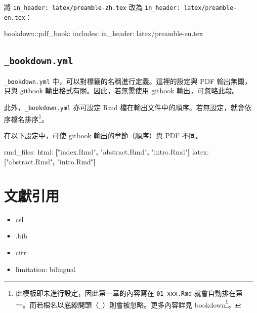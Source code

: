 \documentclass[oneside]{book}
\newenvironment{Shaded}{\begin{snugshade}}{\end{snugshade}}
\newcommand{\KeywordTok}[1]{\textcolor[rgb]{0.13,0.29,0.53}{\textbf{#1}}}
\newcommand{\StringTok}[1]{\textcolor[rgb]{0.31,0.60,0.02}{#1}}
\newcommand{\FunctionTok}[1]{\textcolor[rgb]{0.00,0.00,0.00}{#1}}
\newcommand{\AttributeTok}[1]{\textcolor[rgb]{0.77,0.63,0.00}{#1}}
\renewcommand{\href}[2]{#2\footnote{\url{#1}}}
\providecommand{\tightlist}{%
  \setlength{\itemsep}{0pt}\setlength{\parskip}{0pt}}
\begin{document}
將 \texttt{in\_header:\ latex/preamble-zh.tex} 改為
\texttt{in\_header:\ latex/preamble-en.tex}：

\begin{Shaded}
\begin{Highlighting}[]
\FunctionTok{bookdown:}\AttributeTok{:pdf_book:}
  \FunctionTok{includes:}
    \FunctionTok{in_header:}\AttributeTok{ latex/preamble-en.tex}
\end{Highlighting}
\end{Shaded}

\subsection{\texorpdfstring{\texttt{\_bookdown.yml}}{\_bookdown.yml}}\label{bookdown.yml}

\texttt{\_bookdown.yml} 中，可以對標籤的名稱進行定義。這裡的設定與 PDF
輸出無關，只與 gitbook 輸出格式有關。因此，若無需使用 gitbook
輸出，可忽略此段。

此外，\texttt{\_bookdown.yml} 亦可設定 Rmd
檔在輸出文件中的順序。若無設定，就會依序檔名排序\footnote{此模板即未進行設定，因此第一章的內容寫在
  \texttt{01-xxx.Rmd}
  就會自動排在第一。而若檔名以底線開頭（\texttt{\_}）則會被忽略。更多內容詳見
  \href{https://bookdown.org/yihui/bookdown/usage.html}{bookdown}。}。

在以下設定中，可使 gitbook 輸出的章節（順序）與 PDF 不同。

\begin{Shaded}
\begin{Highlighting}[]
\FunctionTok{rmd_files:}
  \FunctionTok{html:}\AttributeTok{ }\KeywordTok{[}\StringTok{"index.Rmd"}\KeywordTok{,} \StringTok{"abstract.Rmd"}\KeywordTok{,} \StringTok{"intro.Rmd"}\KeywordTok{]}
  \FunctionTok{latex:}\AttributeTok{ }\KeywordTok{[}\StringTok{"abstract.Rmd"}\KeywordTok{,} \StringTok{"intro.Rmd"}\KeywordTok{]}
\end{Highlighting}
\end{Shaded}

\section{文獻引用}\label{bib-cite}

\begin{itemize}
\tightlist
\item
  csl
\item
  .bib
\item
  citr
\item
  limitation: bilingual
\end{itemize}
\end{document}
